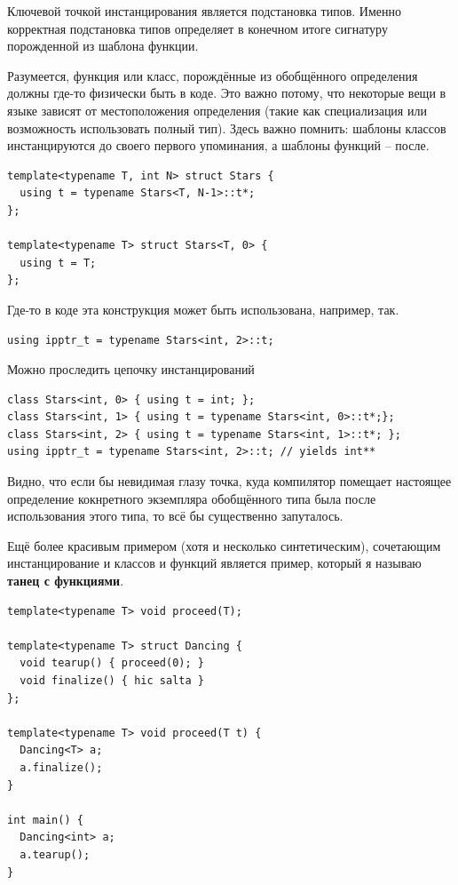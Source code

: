 \documentclass[a4paper,12pt,oneside]{article}
\begin{document}
Ключевой точкой инстанцирования является подстановка типов. Именно корректная подстановка типов определяет в конечном итоге сигнатуру порожденной из шаблона функции.

Разумеется, функция или класс, порождённые из обобщённого определения должны где-то физически быть в коде. Это важно потому, что некоторые вещи в языке зависят от местоположения определения (такие как специализация или возможность использовать полный тип). Здесь важно помнить: шаблоны классов инстанцируются до своего первого упоминания, а шаблоны функций -- после.

\begin{lstlisting}
template<typename T, int N> struct Stars {
  using t = typename Stars<T, N-1>::t*;
};

template<typename T> struct Stars<T, 0> {
  using t = T;
};
\end{lstlisting}

Где-то в коде эта конструкция может быть использована, например, так.

\begin{lstlisting}
using ipptr_t = typename Stars<int, 2>::t;
\end{lstlisting}

Можно проследить цепочку инстанцирований

\begin{lstlisting}
class Stars<int, 0> { using t = int; };
class Stars<int, 1> { using t = typename Stars<int, 0>::t*;}; 
class Stars<int, 2> { using t = typename Stars<int, 1>::t*; };
using ipptr_t = typename Stars<int, 2>::t; // yields int**
\end{lstlisting}

Видно, что если бы невидимая глазу точка, куда компилятор помещает настоящее определение кокнретного экземпляра обобщённого типа была после использования этого типа, то всё бы существенно запуталось.

Ещё более красивым примером (хотя и несколько синтетическим), сочетающим инстанцирование и классов и функций является пример, который я называю \textbf{танец с функциями}.

\begin{lstlisting}
template<typename T> void proceed(T);

template<typename T> struct Dancing {
  void tearup() { proceed(0); }
  void finalize() { hic salta }
};

template<typename T> void proceed(T t) {
  Dancing<T> a;
  a.finalize();
}

int main() {
  Dancing<int> a;
  a.tearup();
}
\end{lstlisting}
\end{document}
